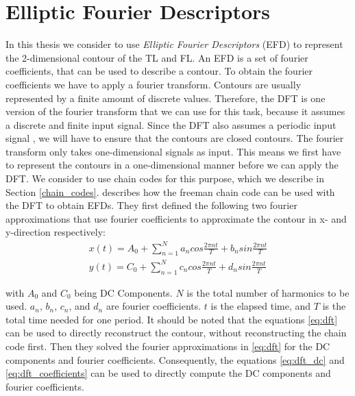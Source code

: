 \documentclass[thesis.tex]{subfiles}
\begin{document}

\section{Elliptic Fourier Descriptors} \label{elliptic_fourier_descriptors}
In this thesis we consider to use \textit{Elliptic Fourier Descriptors} (EFD) \cite{giardinia} to represent the 2-dimensional contour of the TL and FL. An EFD is a set of fourier coefficients, that can be used to describe a contour. To obtain the fourier coefficients we have to apply a fourier transform. Contours are usually represented by a finite amount of discrete values. Therefore, the DFT is one version of the fourier transform that we can use for this task, because it assumes a discrete and finite input signal. Since the DFT also assumes a periodic input signal \cite{dspguide}, we will have to ensure that the contours are closed contours. The fourier transform only takes one-dimensional signals as input. This means we first have to represent the contours in a one-dimensional manner before we can apply the DFT. We consider to use chain codes for this purpose, which we describe in Section \ref{chain_codes}. \cite{giardinia} describes how the freeman chain code can be used with the DFT to obtain EFDs. They first defined the following two fourier approximations that use fourier coefficients to approximate the contour in x- and y-direction respectively:
\begin{equation} \label{eq:dft}
\begin{split}
 x(t) = A_0 + \sum_{n=1}^{N} a_n cos \frac{2\pi n t}{T} + b_n sin \frac{2\pi n t}{T} \\
 y(t) = C_0 + \sum_{n=1}^{N} c_n cos \frac{2\pi n t}{T} + d_n sin \frac{2\pi n t}{T}
\end{split}
\end{equation}

with $ A_0$ and $C_0 $ being DC Components. $N$ is the total number of harmonics to be used. $a_n$, $b_n$, $c_n$, and $d_n$ are fourier coefficients. $t$ is the elapsed time, and $T$ is the total time needed for one period. It should be noted that the equations \ref{eq:dft} can be used to directly reconstruct the contour, without reconstructing the chain code first. 
Then they solved the fourier approximations in \ref{eq:dft} for the DC components and fourier coefficients. Consequently, the equations \ref{eq:dft_dc} and \ref{eq:dft_coefficients} can be used to directly compute the DC components and fourier coefficients. 
\end{document}
